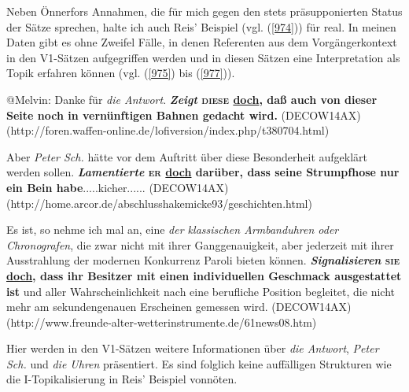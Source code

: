 {Neben Önnerfors Annahmen, die für mich gegen den stets präsupponierten Status der Sätze sprechen, halte ich auch Reis' Beispiel (vgl. (\ref{974})) für real. In meinen Daten gibt es ohne Zweifel Fälle, in denen Referenten aus dem Vorgänger\-kontext in den V1-Sätzen aufgegriffen werden und in diesen Sätzen eine Interpretation als Topik erfahren können (vgl. (\ref{975}) bis (\ref{977})).

\begin{exe}
	\ex\label{975}
	\scriptsize
	@Melvin: Danke für \emph{die Antwort}. \textbf{\textit{Zeigt} \textsc{diese} \underline{doch}, daß auch von dieser Seite noch in vernünftigen Bahnen 		gedacht wird.}	
	\hfill\hbox{(DECOW14AX)}
	\newline
	\hbox{}\hfill\hbox{(http://foren.waffen-online.de/lofiversion/index.php/t380704.html)}
\end{exe}
			 
\begin{exe}
	\ex\label{976}
	\scriptsize
	Aber \emph{Peter Sch.} hätte vor dem Auftritt über diese Besonderheit aufgeklärt werden sollen. \textbf{\textit{Lamentierte} \textsc{er} 					\underline{doch} darüber, dass seine Strumpfhose nur ein Bein habe}.....kicher......	
	\hfill\hbox{(DECOW14AX)}
	\newline
	\hbox{}\hfill\hbox{(http://home.arcor.de/abschlusshakemicke93/geschichten.html)}
\end{exe}						       

\begin{exe}	
	\ex\label{977}
	\scriptsize
	Es ist, so nehme ich mal an, eine \emph{der klassischen Armbanduhren oder Chronografen}, die zwar nicht mit ihrer Ganggenauigkeit, aber jederzeit mit 		ihrer Ausstrahlung der modernen Konkurrenz Paroli bieten können. \textbf{\textit{Signalisieren} \textsc{sie} \underline{doch}, dass ihr Besitzer mit 		einen individuellen Geschmack ausgestattet ist} und aller Wahrscheinlichkeit nach eine berufliche Position begleitet, die nicht mehr am sekundengenauen 	Erscheinen gemessen wird. 
	\hfill\hbox{(DECOW14AX)}
	\newline
	\hbox{}\hfill\hbox{(http://www.freunde-alter-wetterinstrumente.de/61news08.htm)}
\end{exe}						            						
Hier werden in den V1-Sätzen weitere Informationen über \textit{die Antwort}, \textit{Peter Sch.} und \textit{die Uhren} präsentiert. Es sind folglich keine auffälligen Strukturen wie die I-Topikalisierung  in Reis' Beispiel vonnöten. 

}
